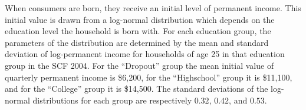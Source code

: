 \documentclass[../HAFiscal]{subfiles}
\begin{document}

When consumers are born, they receive an initial level of permanent income. This initial value is drawn from a log-normal distribution which depends on the education level the household is born with. For each education group, the parameters of the distribution are determined by the mean and standard deviation of log-permanent income for households of age 25 in that education group in the SCF 2004. For the ``Dropout'' group the mean initial value of quarterly permanent income is \$6,200, for the ``Highschool'' group it is \$11,100, and for the ``College'' group it is \$14,500. The standard deviations of the log-normal distributions for each group are respectively $0.32$, $0.42$, and $0.53$. 
\end{document}
